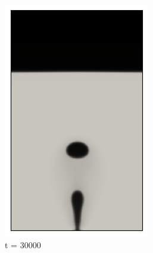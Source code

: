 \begin{figure}[H]
\begin{subfigure}{0.25\textwidth}
		\includegraphics[width=\linewidth]{figs/cap4/bb_760_s30}
		\caption{t = 30000}
		\label{fig:5}
	\end{subfigure}\hfil 
	\begin{subfigure}{0.25\textwidth}

\end{subfigure}
\end{figure}
